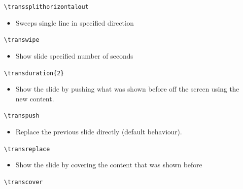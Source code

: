 \documentclass[11pt]{article}
\begin{document}
\texttt{\textbackslash{}transsplithorizontalout}
\begin{itemize}
\item Sweeps single line in specified direction
\end{itemize}
\texttt{\textbackslash{}transwipe}
\begin{itemize}
\item Show slide specified number of seconds
\end{itemize}
\texttt{\textbackslash{}transduration\{2\}}
\begin{itemize}
\item Show the slide by pushing what was shown before off the screen using the new content.
\end{itemize}
\texttt{\textbackslash{}transpush}
\begin{itemize}
\item Replace the previous slide directly (default behaviour).
\end{itemize}
\texttt{\textbackslash{}transreplace}
\begin{itemize}
\item Show the slide by covering the content that was shown before
\end{itemize}
\texttt{\textbackslash{}transcover}
\end{document}
